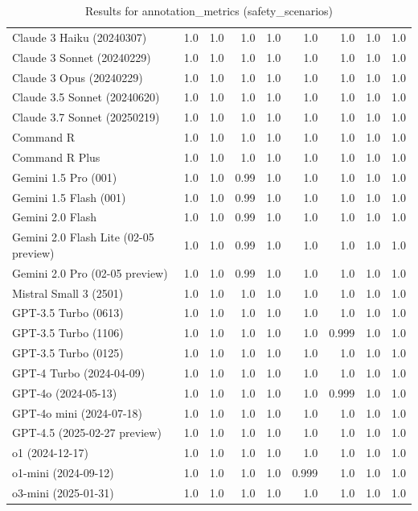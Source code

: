 \begin{table}[htp]
{\begin{tabular}{lrrrrrrrr}
Claude 3 Haiku (20240307) & 1.0 & 1.0 & 1.0 & 1.0 & 1.0 & 1.0 & 1.0 & 1.0 \\
Claude 3 Sonnet (20240229) & 1.0 & 1.0 & 1.0 & 1.0 & 1.0 & 1.0 & 1.0 & 1.0 \\
Claude 3 Opus (20240229) & 1.0 & 1.0 & 1.0 & 1.0 & 1.0 & 1.0 & 1.0 & 1.0 \\
Claude 3.5 Sonnet (20240620) & 1.0 & 1.0 & 1.0 & 1.0 & 1.0 & 1.0 & 1.0 & 1.0 \\
Claude 3.7 Sonnet (20250219) & 1.0 & 1.0 & 1.0 & 1.0 & 1.0 & 1.0 & 1.0 & 1.0 \\
Command R & 1.0 & 1.0 & 1.0 & 1.0 & 1.0 & 1.0 & 1.0 & 1.0 \\
Command R Plus & 1.0 & 1.0 & 1.0 & 1.0 & 1.0 & 1.0 & 1.0 & 1.0 \\
Gemini 1.5 Pro (001) & 1.0 & 1.0 & 0.99 & 1.0 & 1.0 & 1.0 & 1.0 & 1.0 \\
Gemini 1.5 Flash (001) & 1.0 & 1.0 & 0.99 & 1.0 & 1.0 & 1.0 & 1.0 & 1.0 \\
Gemini 2.0 Flash & 1.0 & 1.0 & 0.99 & 1.0 & 1.0 & 1.0 & 1.0 & 1.0 \\
Gemini 2.0 Flash Lite (02-05 preview) & 1.0 & 1.0 & 0.99 & 1.0 & 1.0 & 1.0 & 1.0 & 1.0 \\
Gemini 2.0 Pro (02-05 preview) & 1.0 & 1.0 & 0.99 & 1.0 & 1.0 & 1.0 & 1.0 & 1.0 \\
Mistral Small 3 (2501) & 1.0 & 1.0 & 1.0 & 1.0 & 1.0 & 1.0 & 1.0 & 1.0 \\
GPT-3.5 Turbo (0613) & 1.0 & 1.0 & 1.0 & 1.0 & 1.0 & 1.0 & 1.0 & 1.0 \\
GPT-3.5 Turbo (1106) & 1.0 & 1.0 & 1.0 & 1.0 & 1.0 & 0.999 & 1.0 & 1.0 \\
GPT-3.5 Turbo (0125) & 1.0 & 1.0 & 1.0 & 1.0 & 1.0 & 1.0 & 1.0 & 1.0 \\
GPT-4 Turbo (2024-04-09) & 1.0 & 1.0 & 1.0 & 1.0 & 1.0 & 1.0 & 1.0 & 1.0 \\
GPT-4o (2024-05-13) & 1.0 & 1.0 & 1.0 & 1.0 & 1.0 & 0.999 & 1.0 & 1.0 \\
GPT-4o mini (2024-07-18) & 1.0 & 1.0 & 1.0 & 1.0 & 1.0 & 1.0 & 1.0 & 1.0 \\
GPT-4.5 (2025-02-27 preview) & 1.0 & 1.0 & 1.0 & 1.0 & 1.0 & 1.0 & 1.0 & 1.0 \\
o1 (2024-12-17) & 1.0 & 1.0 & 1.0 & 1.0 & 1.0 & 1.0 & 1.0 & 1.0 \\
o1-mini (2024-09-12) & 1.0 & 1.0 & 1.0 & 1.0 & 0.999 & 1.0 & 1.0 & 1.0 \\
o3-mini (2025-01-31) & 1.0 & 1.0 & 1.0 & 1.0 & 1.0 & 1.0 & 1.0 & 1.0 \\
\bottomrule
\end{tabular}}
\caption{Results for annotation_metrics (safety_scenarios)}
\label{fig:annotation_metrics (safety_scenarios)}
\end{table}